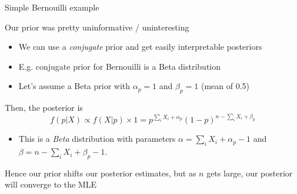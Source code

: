 \documentclass[notes,11pt, aspectratio=169]{beamer}
\newenvironment{wideitemize}{\itemize\addtolength{\itemsep}{10pt}}{\enditemize}
\begin{document}
\begin{frame}{Simple Bernouilli example}
  \begin{wideitemize}
  \item Our prior was pretty uninformative / uninteresting
    \begin{itemize}
    \item We can use a \emph{conjugate} prior and get easily interpretable posteriors
    \item E.g. conjugate prior for Bernouilli is a Beta distribution
    \item Let's assume a Beta prior with $\alpha_{p} = 1$ and $\beta_{p} = 1$ (mean of 0.5)
    \end{itemize}
  \item Then, the posterior is
    $$ f(p | X) \propto f(X | p) \times 1  = p^{\sum_{i}X_{i} + \alpha_{p}}(1-p)^{n - \sum_{i}X_{i} + \beta_{p}}$$
    \begin{itemize}
    \item This is a \emph{Beta} distribution with
      parameters $\alpha = \sum_{i}X_{i} + \alpha_{p} - 1$ and
      $\beta = n - \sum_{i}X_{i} + \beta_{p} - 1$.
    \end{itemize}
  \item Hence our prior shifts our posterior estimates, but as $n$
    gets large, our posterior will converge to the MLE
  \end{wideitemize}
\end{frame}
\end{document}
